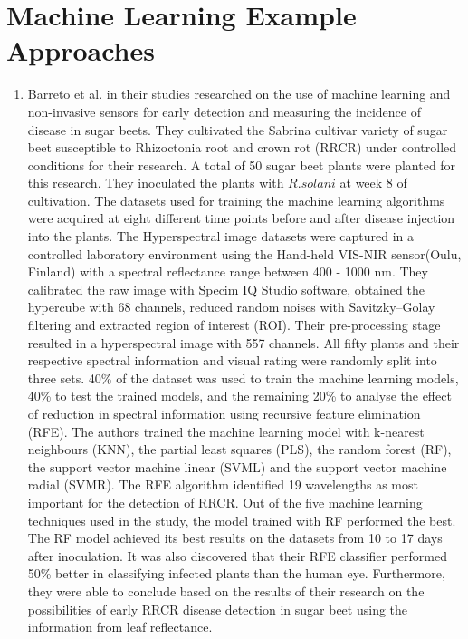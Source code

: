 \section{Machine Learning Example Approaches}\label{sec:machineapproach}
\begin{enumerate}
\item Barreto et al. \cite{Barreto2020HyperspectralIO} in their studies researched on the use of machine learning and non-invasive sensors for early detection and measuring the incidence of disease in sugar beets. They cultivated the Sabrina cultivar variety of sugar beet susceptible to Rhizoctonia root and crown rot (RRCR) under controlled conditions for their research. A total of 50 sugar beet plants were planted for this research. They inoculated the plants with $R.solani$ at week 8 of cultivation. The datasets used for training the machine learning algorithms were acquired at eight different time points before and after disease injection into the plants. The Hyperspectral image datasets were captured in a controlled laboratory environment using the Hand-held VIS-NIR sensor(Oulu, Finland) with a spectral reflectance range between 400 - 1000 nm. They calibrated the raw image with Specim IQ Studio software, obtained the hypercube with 68 channels, reduced random noises with Savitzky–Golay filtering and extracted region of interest (ROI). Their pre-processing stage resulted in a hyperspectral image with 557 channels. All fifty plants and their respective spectral information and visual rating were randomly split into three sets. 40\% of the dataset was used to train the machine learning models, 40\% to test the trained models, and the remaining 20\% to analyse the effect of reduction in spectral information using recursive feature elimination (RFE). The authors trained the machine learning model with k-nearest neighbours (KNN), the partial least squares (PLS), the random forest (RF), the support vector machine linear (SVML) and the support vector machine radial (SVMR). The RFE algorithm identified 19 wavelengths as most important for the detection of RRCR. Out of the five machine learning techniques used in the study, the model trained with RF performed the best. The RF model achieved its best results on the datasets from 10 to 17 days after inoculation. It was also discovered that their RFE classifier performed 50\% better in classifying infected plants than the human eye. Furthermore, they were able to conclude based on the results of their research on the possibilities of early RRCR disease detection in sugar beet using the information from leaf reflectance.


\end{enumerate}
